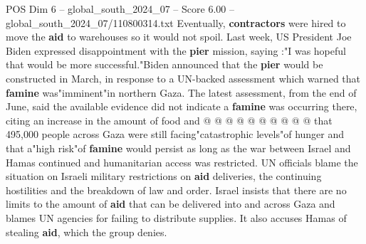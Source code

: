\begin{textsample}{POS Dim 6 – global\_south\_2024\_07 – Score 6.00 – global\_south\_2024\_07/110800314.txt}
Eventually, \textbf{contractors} were hired to move the \textbf{aid} to warehouses so it would not spoil.
Last week, US President Joe Biden expressed disappointment with the \textbf{pier} mission, saying :"I was hopeful that would be more successful."Biden announced that the \textbf{pier} would be constructed in March, in response to a UN-backed assessment which warned that \textbf{famine} was"imminent"in northern Gaza.
The latest assessment, from the end of June, said the available evidence did not indicate a \textbf{famine} was occurring there, citing an increase in the amount of food and @ @ @ @ @ @ @ @ @ @ that 495,000 people across Gaza were still facing"catastrophic levels"of hunger and that a"high risk"of \textbf{famine} would persist as long as the war between Israel and Hamas continued and humanitarian access was restricted.
UN officials blame the situation on Israeli military restrictions on \textbf{aid} deliveries, the continuing hostilities and the breakdown of law and order.
Israel insists that there are no limits to the amount of \textbf{aid} that can be delivered into and across Gaza and blames UN agencies for failing to distribute supplies.
It also accuses Hamas of stealing \textbf{aid}, which the group denies.

\end{textsample}
